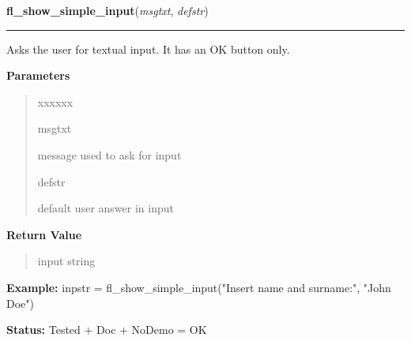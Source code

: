 \hspace{.8\funcindent}\begin{boxedminipage}{\funcwidth}

    \raggedright \textbf{fl\_show\_simple\_input}(\textit{msgtxt}, \textit{defstr})

    \vspace{-1.5ex}

    \rule{\textwidth}{0.5\fboxrule}
\setlength{\parskip}{2ex}
    Asks the user for textual input. It has an OK button only.

\setlength{\parskip}{1ex}
      \textbf{Parameters}
      \vspace{-1ex}

      \begin{quote}
        \begin{Ventry}{xxxxxx}

          \item[msgtxt]

          message used to ask for input

          \item[defstr]

          default user answer in input

        \end{Ventry}

      \end{quote}

      \textbf{Return Value}
    \vspace{-1ex}

      \begin{quote}
      input string

      \end{quote}

\textbf{Example:} inpstr = fl\_show\_simple\_input("Insert name and surname:", "John Doe")



\textbf{Status:} Tested + Doc + NoDemo = OK



    \end{boxedminipage}

    \label{xformslib:flgoodies:fl_show_colormap}

    \vspace{0.5ex}

